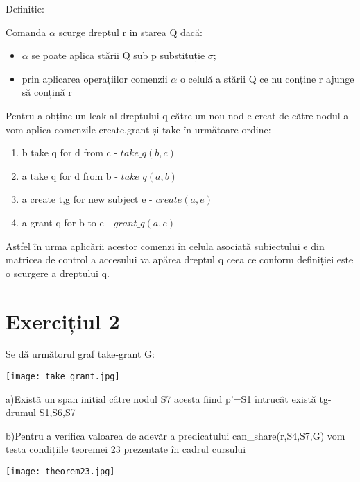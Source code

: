 \documentclass{article}
\begin{document}
Definitie: 

Comanda $\alpha$ scurge dreptul r in starea Q dacă:
\begin{itemize}
    \item$\alpha$ se poate aplica stării Q sub p substituție $\sigma$;
    \item prin aplicarea operațiilor comenzii $\alpha$ o celulă a stării Q ce nu conține r ajunge să conțină r
\end{itemize}
    \pagebreak
    Pentru a obține un leak al dreptului q către un nou nod e creat de către nodul a vom aplica comenzile create,grant și take în următoare ordine:
    \begin{enumerate}
        \item b take q for d from c - $take\_q(b,c)$
        \item a take q for d from b - $take\_q(a,b)$
        \item a create t,g for new subject e - $create(a,e)$
        \item a grant q for b to e - $grant\_q(a,e)$
    \end{enumerate}
    
    Astfel în urma aplicării acestor comenzi în celula asociată subiectului e din matricea de control a accesului va apărea dreptul q ceea ce conform definiției este o scurgere a dreptului q.
    
\section{Exercițiul 2}
    Se dă următorul graf take-grant G:
    
    \texttt{[image: take\_grant.jpg]}
    
a)Există un span inițial câtre nodul S7 acesta fiind p'=S1 întrucât există tg-drumul S1,S6,S7


b)Pentru a verifica valoarea de adevăr a predicatului can\_share(r,S4,S7,G) vom testa condițiile teoremei 23 prezentate în cadrul cursului

     \texttt{[image: theorem23.jpg]}
     
\end{document}
